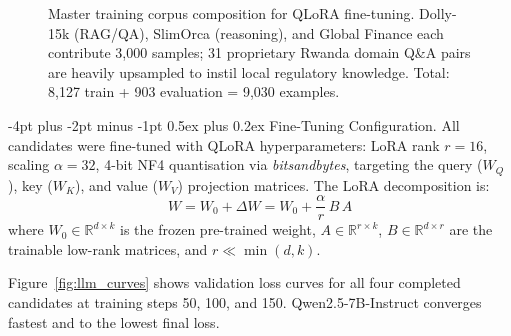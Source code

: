 \documentclass{article}
\makeatletter
\renewcommand\paragraph{\@startsection{paragraph}{4}{\z@}%
  {-4pt plus -2pt minus -1pt}%
  {0.5ex plus 0.2ex}%
  {\normalsize\bf}}
\makeatother
\begin{document}
\begin{figure}[htbp]
\centering
{}
\caption{Master training corpus composition for QLoRA fine-tuning.
         Dolly-15k (RAG/QA), SlimOrca (reasoning), and Global Finance each
         contribute 3{,}000 samples; 31 proprietary Rwanda domain Q\&A pairs
         are heavily upsampled to instil local regulatory knowledge.
         Total: 8{,}127 train + 903 evaluation = 9{,}030 examples.}
\label{fig:llm_data}
\end{figure}

\paragraph{Fine-Tuning Configuration.}
All candidates were fine-tuned with QLoRA hyperparameters:
LoRA rank $r = 16$, scaling $\alpha = 32$, 4-bit NF4 quantisation via
\textit{bitsandbytes}, targeting the query ($W_Q$), key ($W_K$), and
value ($W_V$) projection matrices. The LoRA decomposition is:
\begin{equation}
W = W_0 + \Delta W = W_0 + \frac{\alpha}{r}\,B\,A
\label{eq:lora}
\end{equation}
where $W_0 \in \mathbb{R}^{d \times k}$ is the frozen pre-trained weight,
$A \in \mathbb{R}^{r \times k}$, $B \in \mathbb{R}^{d \times r}$ are the
trainable low-rank matrices, and $r \ll \min(d, k)$.

Figure~\ref{fig:llm_curves} shows validation loss curves for all four
completed candidates at training steps 50, 100, and 150. Qwen2.5-7B-Instruct
converges fastest and to the lowest final loss.
\end{document}
